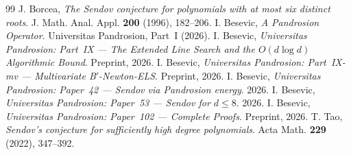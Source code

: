 \documentclass[11pt,a4paper]{article}
\begin{document}
\begin{thebibliography}{99}
 J. Borcea, \textit{The Sendov conjecture for polynomials with at most six distinct roots}. J. Math. Anal. Appl. \textbf{200} (1996), 182--206.
 I. Besevic, \textit{A Pandrosion Operator}. Universitas Pandrosion, Part~I (2026).
 I. Besevic, \textit{Universitas Pandrosion: Part~IX --- The Extended Line Search and the $O(d \log d)$ Algorithmic Bound}. Preprint, 2026.
 I. Besevic, \textit{Universitas Pandrosion: Part~IX-mv --- Multivariate B$'$-Newton-ELS}. Preprint, 2026.
 I. Besevic, \textit{Universitas Pandrosion: Paper~42 --- Sendov via Pandrosion energy}. 2026.
 I. Besevic, \textit{Universitas Pandrosion: Paper~53 --- Sendov for $d \le 8$}. 2026.
 I. Besevic, \textit{Universitas Pandrosion: Paper~102 --- Complete Proofs}. Preprint, 2026.
 T. Tao, \textit{Sendov's conjecture for sufficiently high degree polynomials}. Acta Math. \textbf{229} (2022), 347--392.
\end{thebibliography}
\end{document}

